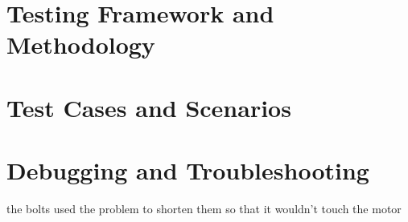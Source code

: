 \section{Testing Framework and Methodology}
\section{Test Cases and Scenarios}
\section{Debugging and Troubleshooting}

\begin{notebox}
	the bolts used the problem to shorten them so that it wouldn't touch the motor 
\end{notebox}

